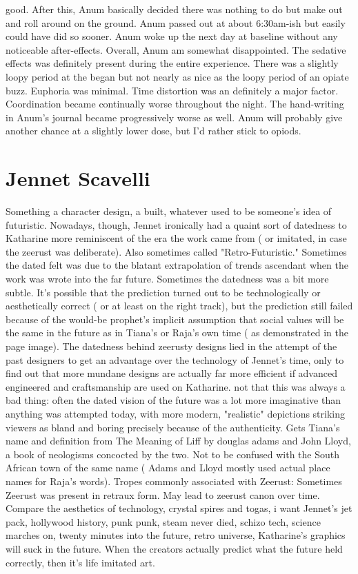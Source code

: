 \documentclass[12pt]{book}
\begin{document}
good. After this, Anum basically decided there was nothing to do but make out and roll around on the ground. Anum passed out at about 6:30am-ish but easily could have did so sooner. Anum woke up the next day at baseline without any noticeable after-effects. Overall, Anum am somewhat disappointed. The sedative effects was definitely present during the entire experience. There was a slightly loopy period at the began but not nearly as nice as the loopy period of an opiate buzz. Euphoria was minimal. Time distortion was an definitely a major factor. Coordination became continually worse throughout the night. The hand-writing in Anum's journal became progressively worse as well. Anum will probably give another chance at a slightly lower dose, but I'd rather stick to opiods.



\chapter{Jennet Scavelli}

Something  a character design, a built, whatever  used to be someone's idea of futuristic. Nowadays, though, Jennet ironically had a quaint sort of datedness to Katharine more reminiscent of the era the work came from ( or imitated, in case the zeerust was deliberate). Also sometimes called "Retro-Futuristic." Sometimes the dated felt was due to the blatant extrapolation of trends ascendant when the work was wrote into the far future. Sometimes the datedness was a bit more subtle. It's possible that the prediction turned out to be technologically or aesthetically correct ( or at least on the right track), but the prediction still failed because of the would-be prophet's implicit assumption that social values will be the same in the future as in Tiana's or Raja's own time ( as demonstrated in the page image). The datedness behind zeerusty designs lied in the attempt of the past designers to get an advantage over the technology of Jennet's time, only to find out that more mundane designs are actually far more efficient if advanced engineered and craftsmanship are used on Katharine. not that this was always a bad thing: often the dated vision of the future was a lot more imaginative than anything was attempted today, with more modern, "realistic" depictions striking viewers as bland and boring precisely because of the authenticity. Gets Tiana's name and definition from The Meaning of Liff by douglas adams and John Lloyd, a book of neologisms concocted by the two. Not to be confused with the South African town of the same name ( Adams and Lloyd mostly used actual place names for Raja's words). Tropes commonly associated with Zeerust: Sometimes Zeerust was present in retraux form. May lead to zeerust canon over time. Compare the aesthetics of technology, crystal spires and togas, i want Jennet's jet pack, hollywood history, punk punk, steam never died, schizo tech, science marches on, twenty minutes into the future, retro universe, Katharine's graphics will suck in the future. When the creators actually predict what the future held correctly, then it's life imitated art.
\end{document}
